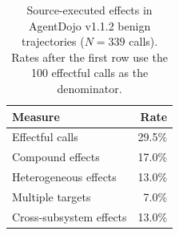 \begin{table}[t]
\centering
\small
\caption{Source-executed effects in AgentDojo v1.1.2 benign trajectories
($N=339$ calls).  Rates after the first row use the 100 effectful calls as the
denominator.}
\label{tab:agentdojo-effect-prevalence}
\begin{tabular}{lr}
\toprule
Measure & Rate \\
\midrule
Effectful calls & 29.5\% \\
Compound effects & 17.0\% \\
Heterogeneous effects & 13.0\% \\
Multiple targets & 7.0\% \\
Cross-subsystem effects & 13.0\% \\
\bottomrule
\end{tabular}
\end{table}
